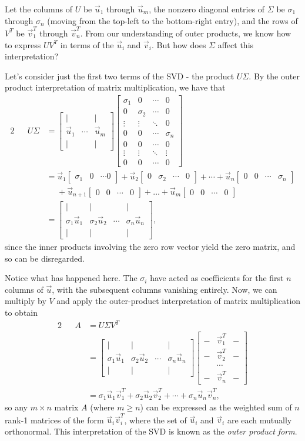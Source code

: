 \documentclass[letterpaper]{article}
\theoremstyle{remark}
\newcommand{\mat}[1]{\ensuremath{\begin{bmatrix}#1\end{bmatrix}}}
\newcommand{\eqn}[1]{\begin{alignat*}{2}#1\end{alignat*}}
\begin{document}
Let the columns of $U$ be $\vec{u}_1$ through $\vec{u}_m$, the nonzero diagonal entries of $\Sigma$ be $\sigma_1$ through $\sigma_n$ (moving from the top-left to the bottom-right entry), and the rows of $V^T$ be $\vec{v}_1^T$ through $\vec{v}_n^T$. From our understanding of outer products, we know how to express $UV^T$ in terms of the $\vec{u}_i$ and $\vec{v}_i$. But how does  $\Sigma$ affect this interpretation?

Let's consider just the first two terms of the SVD - the product $U\Sigma$. By the outer product interpretation of matrix multiplication, we have that
\eqn{
    && U\Sigma &= \mat{| & & | \\ \vec{u}_1 & \cdots & \vec{u}_m \\ | & & |} \mat{\sigma_1 & 0 & \cdots & 0 \\ 0 & \sigma_2 & \cdots & 0 \\
    \vdots & \vdots & \ddots & 0 \\ 0 & 0 & \cdots & \sigma_n \\ 0 & 0 & \cdots & 0 \\ \vdots & \vdots & \ddots & \vdots \\ 0 & 0 & \cdots & 0} \\
    &&&= \vec{u}_1\mat{\sigma_1 & 0 & \cdots 0} + \vec{u}_2\mat{0 & \sigma_2 & \cdots & 0} + \cdots + \vec{u}_n\mat{0 & 0 & \cdots & \sigma_n} \\ 
    &&&\phantom{=}+ \vec{u}_{n+1}\mat{0 & 0 & \cdots & 0} + \ldots + \vec{u}_m\mat{0 & 0 & \cdots & 0} \\
    &&&= \mat{| & | & & | \\ \sigma_1\vec{u}_1 & \sigma_2\vec{u}_2 & \cdots & \sigma_n\vec{u}_n \\ | & | & & | },
}
since the inner products involving the zero row vector yield the zero matrix, and so can be disregarded.

Notice what has happened here. The $\sigma_i$ have acted as coefficients for the first $n$ columns of $\vec{u}$, with the subsequent columns vanishing entirely. Now, we can multiply by $V$ and apply the outer-product interpretation of matrix multiplication to obtain
\eqn{
    && A &= U\Sigma V^T \\
    &&&= \mat{| & | & & | \\ \sigma_1\vec{u}_1 & \sigma_2\vec{u}_2 & \cdots & \sigma_n\vec{u}_n \\ | & | & & | } \mat{ - & \vec{v}_1^T & - \\ - & \vec{v}_2^T & - \\  & \cdots &  \\  - & \vec{v}_n^T & -} \\
    &&&= \sigma_1\vec{u}_1\vec{v}_1^T + \sigma_2\vec{u}_2\vec{v}_2^T + \cdots +  \sigma_n\vec{u}_n\vec{v}_n^T,
}
so any $m\times n$ matrix $A$ (where $m \ge n$) can be expressed as the weighted sum of $n$ rank-1 matrices of the form $\vec{u}_i\vec{v}_i^T$, where the set of $\vec{u}_i$ and $\vec{v}_i$ are each mutually orthonormal. This interpretation of the SVD is known as the \emph{outer product form}.
\end{document}
